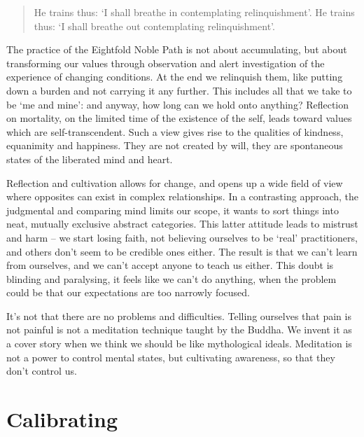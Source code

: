 \begin{quote}
He trains thus: `I shall breathe in contemplating relinquishment'. He
trains thus: `I shall breathe out contemplating relinquishment'.

\bigskip

\end{quote}

The practice of the Eightfold Noble Path is not about accumulating, but
about transforming our values through observation and alert
investigation of the experience of changing conditions. At the end we
relinquish them, like putting down a burden and not carrying it any
further. This includes all that we take to be `me and mine': and anyway,
how long can we hold onto anything? Reflection on mortality, on the
limited time of the existence of the self, leads toward values which are
self-transcendent. Such a view gives rise to the qualities of kindness,
equanimity and happiness. They are not created by will, they are
spontaneous states of the liberated mind and heart.


Reflection and cultivation allows for change, and opens up a wide field
of view where opposites can exist in complex relationships. In a
contrasting approach, the judgmental and comparing mind limits our
scope, it wants to sort things into neat, mutually exclusive abstract
categories. This latter attitude leads to mistrust and harm -- we start
losing faith, not believing ourselves to be `real' practitioners, and
others don't seem to be credible ones either. The result is that we
can't learn from ourselves, and we can't accept anyone to teach us
either. This doubt is blinding and paralysing, it feels like we can't do
anything, when the problem could be that our expectations are too
narrowly focused.

It's not that there are no problems and difficulties. Telling ourselves
that pain is not painful is not a meditation technique taught by the
Buddha. We invent it as a cover story when we think we should be like
mythological ideals. Meditation is not a power to control mental states,
but cultivating awareness, so that they don't control us.

\clearpage

\section{Calibrating}


